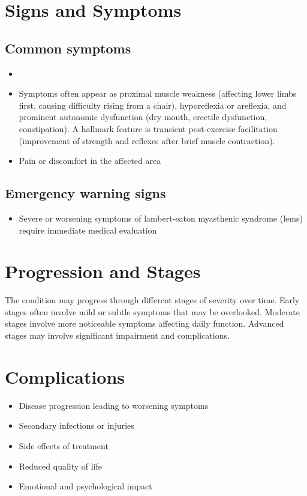 \section{Signs and Symptoms}

\subsection{Common symptoms}
\begin{itemize}[noitemsep]
  \item \item Symptoms often appear as proximal muscle weakness (affecting lower limbs first, causing difficulty rising from a chair), hyporeflexia or areflexia, and prominent autonomic dysfunction (dry mouth, erectile dysfunction, constipation). A hallmark feature is transient post-exercise facilitation (improvement of strength and reflexes after brief muscle contraction).

  \item Pain or discomfort in the affected area
  \end{itemize}

\subsection{Emergency warning signs}
\begin{itemize}[noitemsep]
  \item Severe or worsening symptoms of lambert-eaton myasthenic syndrome (lems) require immediate medical evaluation
\end{itemize}
\section{Progression and Stages}
The condition may progress through different stages of severity over time. Early stages often involve mild or subtle symptoms that may be overlooked. Moderate stages involve more noticeable symptoms affecting daily function. Advanced stages may involve significant impairment and complications.
\section{Complications}
\begin{itemize}[noitemsep]
  \item Disease progression leading to worsening symptoms
  \item Secondary infections or injuries
  \item Side effects of treatment
  \item Reduced quality of life
  \item Emotional and psychological impact
\end{itemize}
